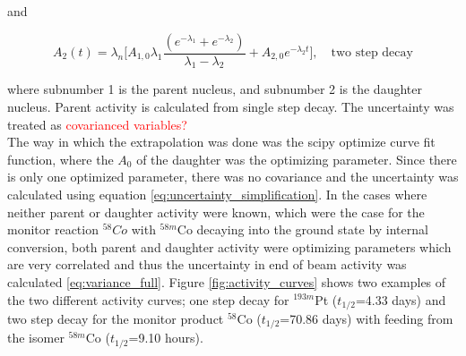 and

\begin{equation} \label{eq:twostep_activity}
    A_2(t) = \lambda_n \Big[ A_{1,0}\lambda_1 \frac{(e^{-\lambda_1 } + e^{-\lambda_2})}{\lambda_1 - \lambda _2} + A_{2,0}e^{-\lambda_2 t} \Big],\quad \text{two step decay}
\end{equation}

where subnumber 1 is the parent nucleus, and subnumber 2 is the daughter nucleus. Parent activity is calculated from single step decay. The uncertainty was treated as \textcolor{red}{covarianced variables?} \\

The way in which the extrapolation was done was the scipy optimize curve fit function, where the $A_0$ of the daughter was the optimizing parameter. Since there is only one optimized parameter, there was no covariance and the uncertainty was calculated using equation \ref{eq:uncertainty_simplification}.  In the cases where neither parent or daughter activity were known, which were the case for the monitor reaction $^{58}Co$ with $^{58m}$Co decaying into the ground state by internal conversion, both parent and daughter activity were optimizing parameters which are very correlated and thus the uncertainty in end of beam activity was calculated \ref{eq:variance_full}. Figure \ref{fig:activity_curves} shows two examples of the two different activity curves; one step decay for $^{193m}$Pt ($t_{1/2}$=4.33 days) and two step decay for the monitor product $^{58}$Co ($t_{1/2}$=70.86 days) with feeding from the isomer $^{58m}$Co ($t_{1/2}$=9.10 hours).  



